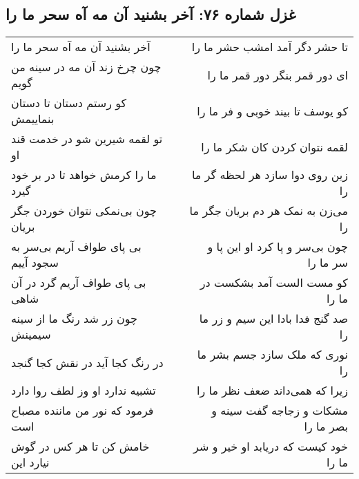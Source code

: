 \begin{center}
\section*{غزل شماره ۷۶: آخر بشنید آن مه آه سحر ما را}
\label{sec:0076}
\begin{longtable}{l p{0.5cm} r}
آخر بشنید آن مه آه سحر ما را
&&
تا حشر دگر آمد امشب حشر ما را
\\
چون چرخ زند آن مه در سینه من گویم
&&
ای دور قمر بنگر دور قمر ما را
\\
کو رستم دستان تا دستان بنماییمش
&&
کو یوسف تا بیند خوبی و فر ما را
\\
تو لقمه شیرین شو در خدمت قند او
&&
لقمه نتوان کردن کان شکر ما را
\\
ما را کرمش خواهد تا در بر خود گیرد
&&
زین روی دوا سازد هر لحظه گر ما را
\\
چون بی‌نمکی نتوان خوردن جگر بریان
&&
می‌زن به نمک هر دم بریان جگر ما را
\\
بی پای طواف آریم بی‌سر به سجود آییم
&&
چون بی‌سر و پا کرد او این پا و سر ما را
\\
بی پای طواف آریم گرد در آن شاهی
&&
کو مست الست آمد بشکست در ما را
\\
چون زر شد رنگ ما از سینه سیمینش
&&
صد گنج فدا بادا این سیم و زر ما را
\\
در رنگ کجا آید در نقش کجا گنجد
&&
نوری که ملک سازد جسم بشر ما را
\\
تشبیه ندارد او وز لطف روا دارد
&&
زیرا که همی‌داند ضعف نظر ما را
\\
فرمود که نور من ماننده مصباح است
&&
مشکات و زجاجه گفت سینه و بصر ما را
\\
خامش کن تا هر کس در گوش نیارد این
&&
خود کیست که دریابد او خیر و شر ما را
\\
\end{longtable}
\end{center}
